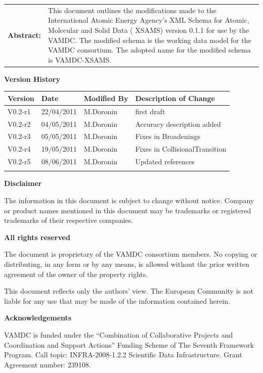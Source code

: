 {\begin{titlepage}
\begin{tabular}{p{1.7in}p{4.3in}}
\textbf{Abstract:} & 
This document outlines the modifications made to the International Atomic
Energy Agency's XML Schema for Atomic, Molecular and Solid Data ( XSAMS)
version 0.1.1 for use by the VAMDC.  The modified schema is the working
data model for the VAMDC consortium.  The adopted name for the modified
schema is VAMDC-XSAMS.  
\end{tabular}



\end{titlepage}

\noindent \textbf{Version History}

\textbf{}

\noindent \begin{tabular}{|l|l|l|l|} 
\hline 
\textbf{Version} & \textbf{Date} & \textbf{Modified By} & \textbf{Description of Change} \\ \hline 
V0.2-r1 & 22/04/2011 & M.Doronin & first draft \\ \hline 
V0.2-r2 & 04/05/2011 & M.Doronin & Accuracy description added \\ \hline 
V0.2-r3 & 05/05/2011 & M.Doronin & Fixes in Broadenings \\ \hline
V0.2-r4 & 19/05/2011 & M.Doronin & Fixes in CollisionalTransition \\ \hline
V0.2-r5 & 08/06/2011 & M.Doronin & Updated references \\ \hline
 &  &  &  \\ \hline 
\end{tabular}

\textbf{}

\noindent \textbf{Disclaimer}

\noindent The information in this document is subject to change without notice. Company or product names mentioned in this document may be trademarks or registered trademarks of their respective companies.


\textbf{}

\noindent \textbf{All rights reserved}

\noindent The document is proprietary of the VAMDC consortium members. No copying or distributing, in any form or by any means, is allowed without the prior written agreement of the owner of the property rights.

\noindent 

\noindent This document reflects only the authors' view. The European Community is not liable for any use that may be made of the information contained herein.

\textbf{}

\noindent \textbf{Acknowledgements}

\noindent VAMDC is funded under the ``Combination of Collaborative Projects and Coordination and  Support Actions'' Funding Scheme of The Seventh Framework Program. Call topic: INFRA-2008-1.2.2 Scientific Data Infrastructure. Grant Agreement number: 239108.

\textbf{}

}
